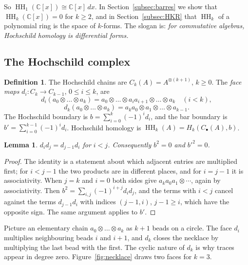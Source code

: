 \documentclass[11pt,oneside,reqno]{article}
\DeclareMathOperator{\HH}{HH}
\newcommand{\C}{\mathbb C}
\theoremstyle{plain}
\newtheorem{lemma}[theorem]{Lemma}
\theoremstyle{definition}
\newtheorem{definition}[theorem]{Definition}
\theoremstyle{remark}
\begin{document}
So \(\HH_1(\C[x])\cong\C[x]\,dx\). In Section~\ref{subsec:barres} we show that
\(\HH_k(\C[x])=0\) for \(k\ge2\), and in Section~\ref{subsec:HKR} that
\(\HH_k\) of a polynomial ring is the space of \(k\)-forms. The slogan is:
\emph{for commutative algebras, Hochschild homology is differential forms.}

\subsection{The Hochschild complex}\label{subsec:complex}
\begin{definition}\label{def:hochschild}
The Hochschild chains are \(C_k(A)=A^{\otimes(k+1)}\), \(k\ge0\). The
\emph{face maps} \(d_i:C_k\to C_{k-1}\), \(0\le i\le k\), are
\[
 d_i(a_0\otimes\dots\otimes a_k)=a_0\otimes\dots\otimes a_ia_{i+1}\otimes
 \dots\otimes a_k\quad(i<k),\]
\[
 d_k(a_0\otimes\dots\otimes a_k)=a_ka_0\otimes a_1\otimes\dots\otimes a_{k-1}.
\]
The Hochschild boundary is \(b=\sum_{i=0}^k(-1)^id_i\), and the bar
boundary is \(b'=\sum_{i=0}^{k-1}(-1)^id_i\). Hochschild homology is
\(\HH_k(A)=H_k(C_\bullet(A),b)\).
\end{definition}

\begin{lemma}\label{lem:bb}
\(d_id_j=d_{j-1}d_i\) for \(i<j\). Consequently \(b^2=0\) and \(b'^2=0\).
\end{lemma}

\begin{proof}
The identity is a statement about which adjacent entries are multiplied
first; for \(i<j-1\) the two products are in different places, and for
\(i=j-1\) it is associativity. When \(j=k\) and \(i=0\) both sides give
\(a_ka_0a_1\otimes\cdots\), again by associativity. Then
\(b^2=\sum_{i,j}(-1)^{i+j}d_id_j\), and the terms with \(i<j\) cancel
against the terms \(d_{j-1}d_i\) with indices \((j-1,i)\), \(j-1\ge i\),
which have the opposite sign. The same argument applies to \(b'\).
\end{proof}

Picture an elementary chain \(a_0\otimes\dots\otimes a_k\) as \(k+1\) beads
on a circle. The face \(d_i\) multiplies neighbouring beads \(i\) and
\(i+1\), and \(d_k\) closes the necklace by multiplying the last bead with
the first. The cyclic nature of \(d_k\) is why traces appear in degree zero.
Figure~\ref{fig:necklace} draws two faces for \(k=3\).
\end{document}
